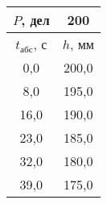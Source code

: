 \begin{tabular}[t]{|c|c|}
\hline
$P$, дел & 200 \\
\hline
$t_{абс}$, с & $h$, мм \\ 
\hline
0,0 & 200,0 \\ 
8,0 & 195,0 \\ 
16,0 & 190,0 \\ 
23,0 & 185,0 \\ 
32,0 & 180,0 \\ 
39,0 & 175,0 \\ 
\hline
\end{tabular}